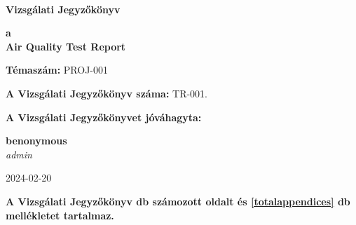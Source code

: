 \documentclass[a4paper,12pt]{article}
\begin{document}
	
	
	\thispagestyle{firstpage}
	
	\begin{flushleft}
		{\footnotesize  
			\textbf{
				 \\
				\vspace{-2mm} 
			}
		}
	\end{flushleft}
	
	\vfill
	
	\begin{center}
		{\Huge \textbf{Vizsgálati Jegyzőkönyv}}
	\end{center}
	
	\vfill
	
	\begin{center}
		\large
		\textbf{a} \\
		\textbf{Air Quality Test Report}
	\end{center}
	
	\vfill
	
	\begin{center}
		\textbf{Témaszám:} PROJ-001
	\end{center}    
	
	\vfill
	
	\begin{center}
		\textbf{A Vizsgálati Jegyzőkönyv száma:} TR-001.
	\end{center}
	
	\begin{center}
		\textbf{A Vizsgálati Jegyzőkönyvet jóváhagyta:}
	\end{center}    
	
	\vfill
	
	\begin{center}
		\textbf{benonymous}\\
		\textit{admin} \\
	\end{center}    
	
	\vfill
	
	\begin{center}
		2024-02-20
	\end{center}    
	
	\vfill
	
	\begin{center}
		\textbf{A Vizsgálati Jegyzőkönyv \pageref{LastPage} db számozott oldalt és \ref{totalappendices} db mellékletet tartalmaz.}
	\end{center}    
	
\end{document}
